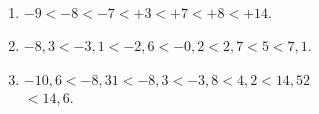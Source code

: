    \ \\ [-7mm]
   {\baselineskip=7mm
   \begin{enumerate}
      \item \blue $-9<-8<-7<+3<+7<+8<+14$.
      \item \blue $-8,3<-3,1<-2,6<-0,2<2,7<5<7,1$.
      \item \blue$-10,6<-8,31<-8,3<-3,8<4,2<14,52$ \\
      \hfill $<14,6$.
   \end{enumerate}}
